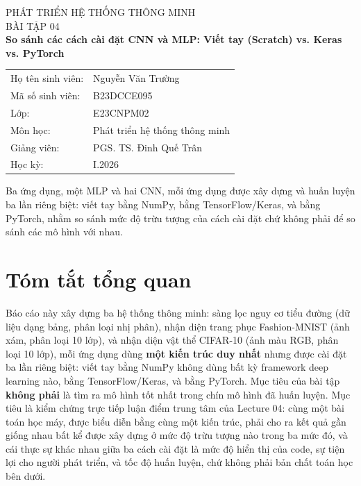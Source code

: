 \documentclass[11pt]{article}
\begin{document}
\begin{titlepage}
\centering
\vspace*{2cm}
{\Large PHÁT TRIỂN HỆ THỐNG THÔNG MINH}\\[0.3cm]
{\Large BÀI TẬP 04}\\[0.5cm]
{\huge \bfseries So sánh các cách cài đặt CNN và MLP: Viết tay (Scratch) vs. Keras vs. PyTorch}\\[2cm]

\begin{tabular}{ll}
Họ tên sinh viên: & Nguyễn Văn Trường \\[0.5cm]
Mã số sinh viên: & B23DCCE095 \\[0.5cm]
Lớp: & E23CNPM02 \\[0.5cm]
Môn học: & Phát triển hệ thống thông minh \\[0.5cm]
Giảng viên: & PGS. TS. Đinh Quế Trân \\[0.5cm]
Học kỳ: & I.2026 \\
\end{tabular}

\vfill
{\large Ba ứng dụng, một MLP và hai CNN, mỗi ứng dụng được xây dựng và huấn luyện
ba lần riêng biệt: viết tay bằng NumPy, bằng TensorFlow/Keras, và bằng PyTorch,
nhằm so sánh mức độ trừu tượng của cách cài đặt chứ không phải để so sánh các
mô hình với nhau.}
\end{titlepage}

\tableofcontents
\newpage

\section{Tóm tắt tổng quan}

Báo cáo này xây dựng ba hệ thống thông minh: sàng lọc nguy cơ tiểu đường
(dữ liệu dạng bảng, phân loại nhị phân), nhận diện trang phục Fashion-MNIST
(ảnh xám, phân loại 10 lớp), và nhận diện vật thể CIFAR-10 (ảnh màu RGB,
phân loại 10 lớp), mỗi ứng dụng dùng \textbf{một kiến trúc duy nhất} nhưng được
cài đặt ba lần riêng biệt: viết tay bằng NumPy không dùng bất kỳ framework
deep learning nào, bằng TensorFlow/Keras, và bằng PyTorch. Mục tiêu của bài
tập \textbf{không phải} là tìm ra mô hình tốt nhất trong chín mô hình đã huấn
luyện. Mục tiêu là kiểm chứng trực tiếp luận điểm trung tâm của Lecture 04:
cùng một bài toán học máy, được biểu diễn bằng cùng một kiến trúc, phải cho
ra kết quả gần giống nhau bất kể được xây dựng ở mức độ trừu tượng nào trong
ba mức đó, và cái thực sự khác nhau giữa ba cách cài đặt là mức độ hiển thị
của code, sự tiện lợi cho người phát triển, và tốc độ huấn luyện, chứ không
phải bản chất toán học bên dưới.
\end{document}
